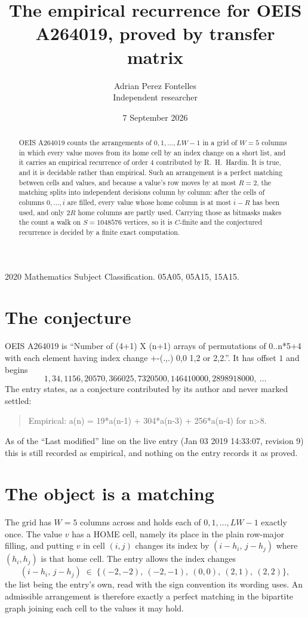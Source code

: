 \documentclass[11pt,a4paper]{article}
\title{The empirical recurrence for OEIS A264019, proved by transfer matrix}
\author{Adrian Perez Fontelles\\ \small Independent researcher}
\date{7 September 2026}
\theoremstyle{plain}
\theoremstyle{definition}
\begin{document}
\maketitle

\begin{abstract}
OEIS A264019 counts the arrangements of $0,1,\dots,LW-1$ in a grid of $W=5$ columns in which
every value moves from its home cell by an index change on a short list, and it carries an
empirical recurrence of order $4$ contributed by R.~H.~Hardin. It is true, and it is
decidable rather than empirical. Such an arrangement is a perfect matching between cells and
values, and because a value's row moves by at most $R=2$, the matching splits into
independent decisions column by column: after the cells of columns $0,\dots,i$ are filled,
every value whose home column is at most $i-R$ has been used, and only $2R$ home columns are
partly used. Carrying those as bitmasks makes the count a walk on $S=1048576$ vertices, so it is
$C$-finite and the conjectured recurrence is decided by a finite exact computation.
\end{abstract}

\noindent\small 2020 Mathematics Subject Classification. 05A05, 05A15, 15A15.\normalsize

\section{The conjecture}

OEIS A264019 is ``Number of (4+1) X (n+1) arrays of permutations of 0..n*5+4 with each element having index change +-(.,.) 0,0 1,2 or 2,2.''. It has offset $1$ and begins
\[
1, 34, 1156, 20570, 366025, 7320500, 146410000, 2898918000,\ \dots
\]
The entry states, as a conjecture contributed by its author and never marked settled:
\begin{quote}
Empirical: a(n) = 19*a(n-1) + 304*a(n-3) + 256*a(n-4) for n>8.
\end{quote}
As of the ``Last modified'' line on the live entry (Jan 03 2019 14:33:07, revision 9) this is still
recorded as empirical, and nothing on the entry records it as proved.

\section{The object is a matching}

The grid has $W=5$ columns across and holds each of $0,1,\dots,LW-1$ exactly once. The value
$v$ has a HOME cell, namely its place in the plain row-major filling, and putting $v$ in cell
$(i,j)$ changes its index by $(i-h_i,\,j-h_j)$ where $(h_i,h_j)$ is that home cell. The entry
allows the index changes
\[
(i-h_i,\,j-h_j)\;\in\;\{(-2,-2),\ (-2,-1),\ (0,0),\ (2,1),\ (2,2)\},
\]
the list being the entry's own, read with the sign convention its wording uses. An admissible
arrangement is therefore exactly a perfect matching in the bipartite graph joining each cell to
the values it may hold.
\end{document}
